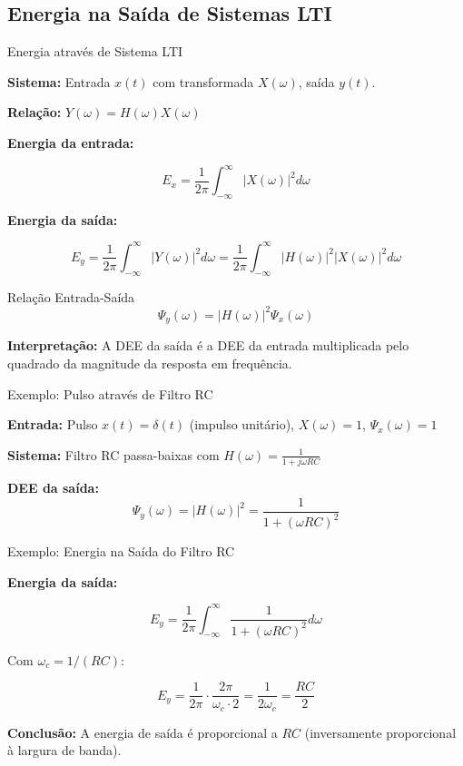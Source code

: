 
\subsection{Energia na Saída de Sistemas LTI}

\begin{frame}{Energia através de Sistema LTI}

\textbf{Sistema:} Entrada $x(t)$ com transformada $X(\omega)$, saída $y(t)$.

\textbf{Relação:} $Y(\omega) = H(\omega) X(\omega)$

\textbf{Energia da entrada:}

\[
E_x = \frac{1}{2\pi} \int_{-\infty}^{\infty} |X(\omega)|^2 d\omega
\]

\textbf{Energia da saída:}

\[
E_y = \frac{1}{2\pi} \int_{-\infty}^{\infty} |Y(\omega)|^2 d\omega = \frac{1}{2\pi} \int_{-\infty}^{\infty} |H(\omega)|^2 |X(\omega)|^2 d\omega
\]

\begin{block}{Relação Entrada-Saída}
\[
\Psi_y(\omega) = |H(\omega)|^2 \Psi_x(\omega)
\]
\end{block}

\textbf{Interpretação:} A DEE da saída é a DEE da entrada multiplicada pelo quadrado da magnitude da resposta em frequência.

\end{frame}


\begin{frame}{Exemplo: Pulso através de Filtro RC}

\textbf{Entrada:} Pulso $x(t) = \delta(t)$ (impulso unitário), $X(\omega) = 1$, $\Psi_x(\omega) = 1$

\textbf{Sistema:} Filtro RC passa-baixas com $H(\omega) = \frac{1}{1 + j\omega RC}$

\textbf{DEE da saída:}
\[
\Psi_y(\omega) = |H(\omega)|^2 = \frac{1}{1 + (\omega RC)^2}
\]

\end{frame}


\begin{frame}{Exemplo: Energia na Saída do Filtro RC}

\textbf{Energia da saída:}

\[
E_y = \frac{1}{2\pi} \int_{-\infty}^{\infty} \frac{1}{1 + (\omega RC)^2} d\omega
\]

Com $\omega_c = 1/(RC)$:

\[
E_y = \frac{1}{2\pi} \cdot \frac{2\pi}{\omega_c \cdot 2} = \frac{1}{2\omega_c} = \frac{RC}{2}
\]

\textbf{Conclusão:} A energia de saída é proporcional a $RC$ (inversamente proporcional à largura de banda).

\end{frame}


